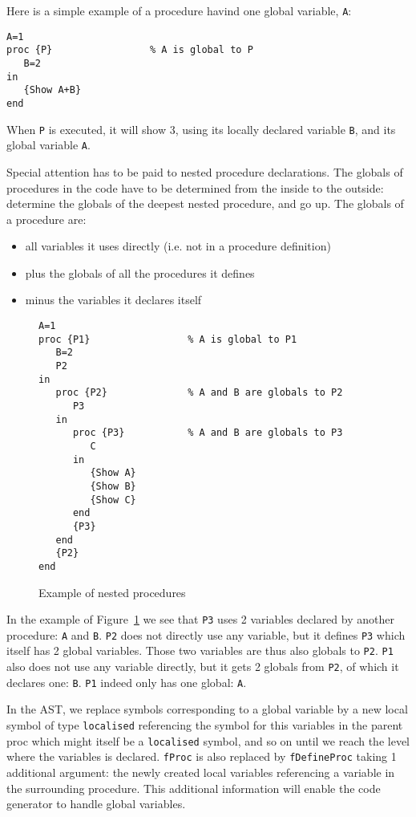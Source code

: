 \documentclass[a4paper]{memoir}
\begin{document}
Here is a simple example of a procedure havind one global variable,
\lstinline!A!:
\begin{lstlisting}
A=1
proc {P}                 % A is global to P
   B=2
in
   {Show A+B}
end
\end{lstlisting}

When \lstinline!P! is executed, it will show 3, using its locally declared
variable \lstinline!B!, and its global variable \lstinline!A!.

Special attention has to be paid to nested procedure declarations.
The globals of procedures in the code have to be determined from the inside to the outside: determine the globals of the deepest nested procedure, and go up. 
The globals of a procedure are:
\begin{itemize}
  \item all variables it uses directly (i.e. not in a procedure definition)
  \item plus the globals of all the procedures it defines
  \item minus the variables it declares itself
\end{itemize}

\begin{figure}[h]
\begin{lstlisting}
A=1
proc {P1}                 % A is global to P1
   B=2
   P2
in
   proc {P2}              % A and B are globals to P2
      P3 
   in
      proc {P3}           % A and B are globals to P3
         C
      in
         {Show A}
         {Show B}
         {Show C}
      end
      {P3}
   end
   {P2}
end
\end{lstlisting}
\caption{Example of nested procedures}
\label{fig:nestedex}
\end{figure}

In the example of Figure~\ref{fig:nestedex} we see that \lstinline!P3! uses 2 variables declared by another procedure: \lstinline!A! and \lstinline!B!. 
\lstinline!P2! does not directly use any variable, but it defines \lstinline!P3! which itself has 2 global variables. Those two variables are thus also globals to \lstinline!P2!.
\lstinline!P1! also does not use any variable directly, but it gets 2 globals from \lstinline!P2!, of which it declares one: \lstinline!B!. \lstinline!P1! indeed only has one global: \lstinline!A!.

In the AST, we replace symbols corresponding to a global
variable by a new local symbol of type \lstinline!localised! referencing the
symbol for this variables in the parent proc which might itself be a
\lstinline!localised! symbol, and so on until we reach the level where the variables is declared.
\lstinline!fProc! is also replaced by
\lstinline!fDefineProc! taking 1 additional argument: the newly created local
variables referencing a variable in the surrounding procedure. This additional
information will enable the code generator to handle global variables.
\end{document}

